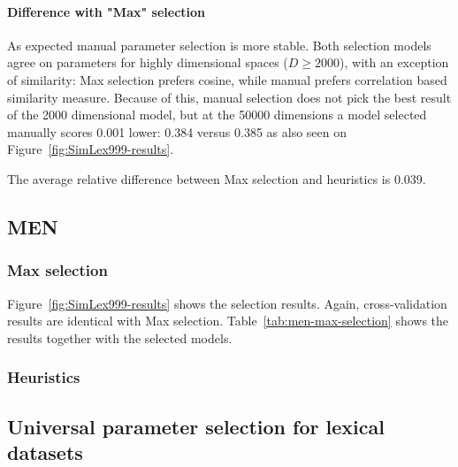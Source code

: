 \paragraph{Difference with "Max" selection}



As expected manual parameter selection is more stable. Both selection models agree on parameters for highly dimensional spaces ($D \geq 2000$), with an exception of similarity: Max selection prefers cosine, while manual prefers correlation based similarity measure. Because of this, manual selection does not pick the best result of the 2000 dimensional model, but at the 50000 dimensions  a model selected manually scores 0.001 lower: 0.384 versus 0.385 as also seen on Figure~\ref{fig:SimLex999-results}.

The average relative difference between Max selection and heuristics is 0.039.

\subsection{MEN}
\label{sec:men}

\subsubsection{Max selection}
\label{sec:max-selection-men}



Figure~\ref{fig:SimLex999-results} shows the selection results. Again, cross-validation results are identical with Max selection. Table~\ref{tab:men-max-selection} shows the results together with the selected models.



\subsubsection{Heuristics}
\label{sec:heuristics-men}


\subsection{Universal parameter selection for lexical datasets}
\label{sec:Universal-lexical-param-selection}



